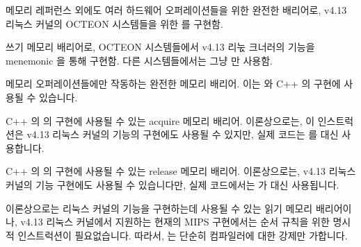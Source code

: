 \begin{description}[style=nextline]
\item[\tco{SYNC}]
	메모리 레퍼런스 외에도 여러 하드웨어 오퍼레이션들을 위한 완전한
	배리어로, v4.13 리눅스 커널의 OCTEON 시스템들을 위한  를
	구현함.

\item[\tco{SYNC_WMB}]
	쓰기 메모리 배리어로, OCTEON 시스템들에서 v4.13 리눇 크너러의
	 기능을  menemonic 을 통해 구현함.
	다른 시스템들에서는 그냥  만 사용함.

\item[\tco{SYNC_MB}]
	메모리 오퍼레이션들에만 작동하는 완전한 메모리 배리어.
	이는  와 C++
	 의 구현에 사용될 수
	있습니다.

\item[\tco{SYNC_ACQUIRE}]
	C++ 의  의 구현에 사용될
	수 있는 acquire 메모리 배리어.
	이론상으로는, 이 인스트럭션은 v4.13 리눅스 커널의
	 기능의 구현에도 사용될 수 있지만, 실제 코드는
	 를 대신 사용합니다.

\item[\tco{SYNC_RELEASE}]
	C++ 의  의 구현에 사용될
	수 있는 release 메모리 배리어.
	이론상으로는, v4.13 리눅스 커널의  기능
	구현에도 사용될 수 있습니다만, 실제 코드에서는  가 대신
	사용됩니다.

\item[\tco{SYNC_RMB}]
	이론상으로는 리눅스 커널의  기능을 구현하는데 사용될 수
	있는 읽기
	메모리 배리어이나, v4.13 리눅스 커널에서 지원하는 현재의 MIPS
	구현에서는 순서 규칙을 위한 명시적 인스트럭션이 필요없습니다.
	따라서,  는 단순히 컴파일러에 대한 강제만 가합니다.
	\iffalse


\end{description}
